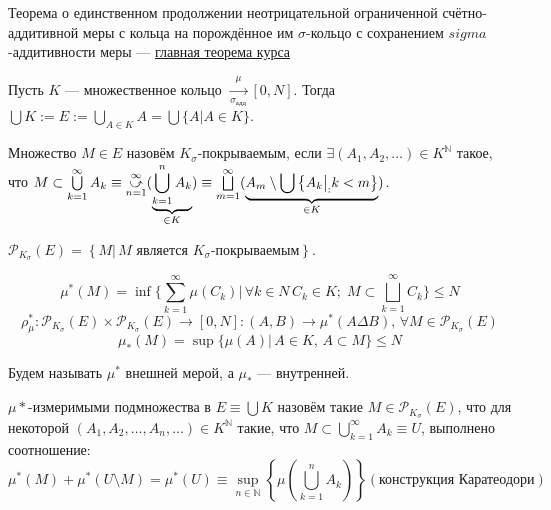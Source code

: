 \documentclass[a4paper, 12pt]{article}
\begin{document}
    

\begin{remark}
    Теорема о единственном продолжении неотрицательной ограниченной счётно-аддитивной меры с кольца на порождённое им $\sigma$-кольцо с сохранением $sigma$-аддитивности меры --- \underline{главная теорема курса}
\end{remark}

\begin{designation}
Пусть $K$ --- множественное кольцо $\xrightarrow[\sigma_{\text{адд}}]{\mu} [0, N]$. Тогда $\bigcup K := E := \bigcup \limits_{A \in K} A = \bigcup \{A | A \in K\} $.
\end{designation}

\begin{definition}
    Множество $M \in E$ назовём $K_{\sigma}$-покрываемым, если $\exists (A_1, A_2, \dots) \in K^{\mathbb{N}}$ такое, 
    что $M \subset \bigcup \limits_{k = 1}^{\infty} A_k \equiv \cuparr{n = 1}{\infty} ( \underbrace{\bigcup \limits_{k = 1}^{n} A_k}_{\in K} ) \equiv \bigsqcup \limits_{m = 1}^{\infty} ( \underbrace{A_m \setminus  \bigcup \left\{ A_k \big|_: k < m \right\}}_{\in K} ) $.
\end{definition}

\begin{designation}
    $\mathcal{P}_{K_{\sigma}}(E) = \left\{M |\, M \text{ является } K_{\sigma}\text{-покрываемым}\right\}$.
\end{designation}

$$\mu^*(M) = \inf \{\sum \limits_{k = 1}^{\infty} \mu(C_k) |\, \forall k \in N\, C_k \in K;\; M \subset \bigsqcup \limits_{k = 1}^{\infty} C_k \} \leqslant N$$
$$\rho^*_{\mu}: \mathcal{P}_{K_{\sigma}}(E) \times \mathcal{P}_{K_{\sigma}}(E) \rightarrow [0, N]: (A, B) \rightarrow \mu^*(A \Delta B), \, \forall M \in \mathcal{P}_{K_{\sigma}}(E)$$ 
$$\mu_*(M) = \sup \{ \mu(A) |\, A \in K, \, A \subset M  \} \leqslant N$$


Будем называть $\mu^*$ внешней мерой, а $\mu_*$ --- внутренней.

\begin{definition}
    $\mu*$-измеримыми подмножества в $E \equiv \bigcup K$ назовём такие $M \in \mathcal{P}_{K_{\sigma}}(E)$, что для некоторой $(A_1, A_2, \dots, A_n, \dots) \in K^{\mathbb{N}}$ такие, что $M \subset \bigcup \limits_{k = 1}^{\infty} A_k \equiv U$, выполнено соотношение:
    $$ \mu^* (M) + \mu^*(U \setminus M) = \mu^*(U) \equiv \sup \limits_{n \in \mathbb{N}}\left\{ \mu \left( \bigcup \limits_{k = 1}^{n} A_k \right)\right\} (\text{конструкция Каратеодори})$$
\end{definition}
\end{document}
